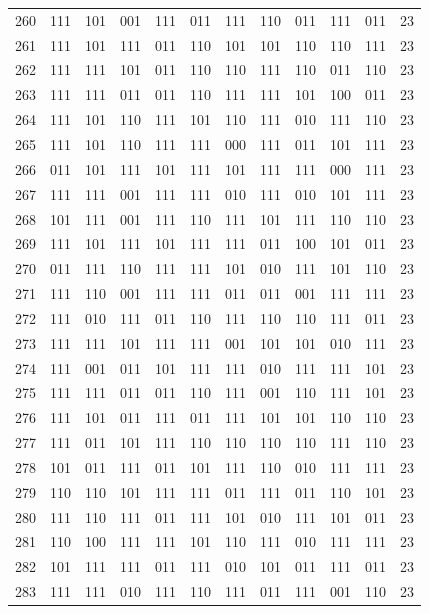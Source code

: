 \begin{longtable}{r*{10}{c}r}
260 & 111 & 101 & 001 & 111 & 011 & 111 & 110 & 011 & 111 & 011 & 23\\
261 & 111 & 101 & 111 & 011 & 110 & 101 & 101 & 110 & 110 & 111 & 23\\
262 & 111 & 111 & 101 & 011 & 110 & 110 & 111 & 110 & 011 & 110 & 23\\
263 & 111 & 111 & 011 & 011 & 110 & 111 & 111 & 101 & 100 & 011 & 23\\
264 & 111 & 101 & 110 & 111 & 101 & 110 & 111 & 010 & 111 & 110 & 23\\
265 & 111 & 101 & 110 & 111 & 111 & 000 & 111 & 011 & 101 & 111 & 23\\
266 & 011 & 101 & 111 & 101 & 111 & 101 & 111 & 111 & 000 & 111 & 23\\
267 & 111 & 111 & 001 & 111 & 111 & 010 & 111 & 010 & 101 & 111 & 23\\
268 & 101 & 111 & 001 & 111 & 110 & 111 & 101 & 111 & 110 & 110 & 23\\
269 & 111 & 101 & 111 & 101 & 111 & 111 & 011 & 100 & 101 & 011 & 23\\
270 & 011 & 111 & 110 & 111 & 111 & 101 & 010 & 111 & 101 & 110 & 23\\
271 & 111 & 110 & 001 & 111 & 111 & 011 & 011 & 001 & 111 & 111 & 23\\
272 & 111 & 010 & 111 & 011 & 110 & 111 & 110 & 110 & 111 & 011 & 23\\
273 & 111 & 111 & 101 & 111 & 111 & 001 & 101 & 101 & 010 & 111 & 23\\
274 & 111 & 001 & 011 & 101 & 111 & 111 & 010 & 111 & 111 & 101 & 23\\
275 & 111 & 111 & 011 & 011 & 110 & 111 & 001 & 110 & 111 & 101 & 23\\
276 & 111 & 101 & 011 & 111 & 011 & 111 & 101 & 101 & 110 & 110 & 23\\
277 & 111 & 011 & 101 & 111 & 110 & 110 & 110 & 110 & 111 & 110 & 23\\
278 & 101 & 011 & 111 & 011 & 101 & 111 & 110 & 010 & 111 & 111 & 23\\
279 & 110 & 110 & 101 & 111 & 111 & 011 & 111 & 011 & 110 & 101 & 23\\
280 & 111 & 110 & 111 & 011 & 111 & 101 & 010 & 111 & 101 & 011 & 23\\
281 & 110 & 100 & 111 & 111 & 101 & 110 & 111 & 010 & 111 & 111 & 23\\
282 & 101 & 111 & 111 & 011 & 111 & 010 & 101 & 011 & 111 & 011 & 23\\
283 & 111 & 111 & 010 & 111 & 110 & 111 & 011 & 111 & 001 & 110 & 23\\

\end{longtable}
